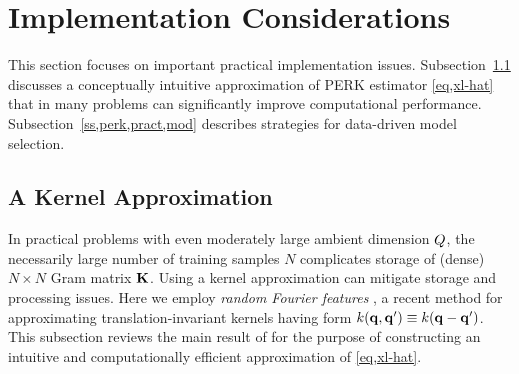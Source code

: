 \section{Implementation Considerations}
\label{s,perk,pract}

This section focuses 
on important practical implementation issues.
Subsection~\ref{ss,perk,pract,apprx} discusses
a conceptually intuitive approximation
of PERK estimator \eqref{eq,xl-hat}
that in many problems
can significantly improve computational performance.
Subsection~\ref{ss,perk,pract,mod} describes strategies 
for data-driven model selection.

\subsection{A Kernel Approximation}
\label{ss,perk,pract,apprx}

In practical problems
with even moderately large ambient dimension $Q$,
the necessarily large number of training samples $N$ 
complicates storage of (dense) $N\times N$ Gram matrix $\mathbf{K}$.
Using a kernel approximation 
can mitigate storage and processing issues.
Here we employ \emph{random Fourier features} \cite{rahimi:07:rff},
a recent method 
for approximating translation-invariant kernels
having form $k\paren{\bmq,\bmq'} \equiv k\paren{\bmq-\bmq'}$.
This subsection reviews the main result of \cite{rahimi:07:rff}
for the purpose of constructing 
an intuitive and computationally efficient approximation 
of \eqref{eq,xl-hat}.

